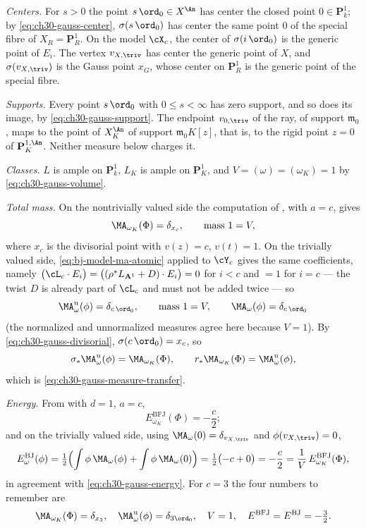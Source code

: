 \begin{example}
\emph{Centers.}  For $s>0$ the point $s\,\ord_0\in X^{\An}$ has center
the closed point $0\in\mathbf P^1_k$; by
\eqref{eq:ch30-gauss-center}, $\sigma(s\,\ord_0)$ has center the same
point $0$ of the special fibre of $X_R=\mathbf P^1_R$.  On the model
$\cX_c$, the center of $\sigma(i\,\ord_0)$ is the generic point of
$E_i$.  The vertex $v_{X,\triv}$ has center the generic point of $X$,
and $\sigma(v_{X,\triv})$ is the Gauss point $x_G$, whose center on
$\mathbf P^1_R$ is the generic point of the special fibre.

\emph{Supports.}  Every point $s\,\ord_0$ with $0\leq s<\infty$ has zero
support, and so does its image, by
\eqref{eq:ch30-gauss-support}.  The endpoint $v_{0,\triv}$ of the ray, of
support $\mathfrak m_0$, maps to the point of $X_K^{\An}$ of support
$\mathfrak m_0K[z]$, that is, to the rigid point $z=0$ of
$\mathbf P^{1,\An}_K$.  Neither measure below charges it.

\emph{Classes.}  $L$ is ample on $\mathbf P^1_k$, $L_K$ is ample on
$\mathbf P^1_K$, and $V=(\omega)=(\omega_K)=1$ by
\eqref{eq:ch30-gauss-volume}.

\emph{Total mass.}  On the nontrivially valued side the computation of
, with $a=c$, gives
\[
 \MA_{\omega_K}(\Phi)=\delta_{x_c},
 \qquad \text{mass }1=V,
\]
where $x_c$ is the divisorial point with $v(z)=c$, $v(t)=1$.  On the
trivially valued side, \eqref{eq:bj-model-ma-atomic} applied to
$\cY_c$ gives the same coefficients, namely
$\bigl(\cL_c\cdot E_i\bigr)
 =\bigl((\rho^*L_{\mathbf A^1}+D)\cdot E_i\bigr)=0$ for $i<c$ and
$=1$ for $i=c$ --- the twist $D$ is already part of $\cL_c$ and must
not be added twice --- so
\[
 \MA^{\mathrm u}_\omega(\phi)=\delta_{c\,\ord_0},
 \qquad\text{mass }1=V,
 \qquad
 \MA_\omega(\phi)=\delta_{c\,\ord_0}
\]
(the normalized and unnormalized measures agree here because $V=1$).  By
\eqref{eq:ch30-gauss-divisorial}, $\sigma(c\,\ord_0)=x_c$, so
\[
 \sigma_*\MA^{\mathrm u}_\omega(\phi)=\MA_{\omega_K}(\Phi),
 \qquad
 r_*\MA_{\omega_K}(\Phi)=\MA^{\mathrm u}_\omega(\phi),
\]
which is \eqref{eq:ch30-gauss-measure-transfer}.

\emph{Energy.}  From  with $d=1$, $a=c$,
\[
 E^{\mathrm{BFJ}}_{\omega_K}(\Phi)=-\frac c2 ;
\]
and on the trivially valued side, using
$\MA_\omega(0)=\delta_{v_{X,\triv}}$ and $\phi(v_{X,\triv})=0$,
\[
 E^{\mathrm{BJ}}_\omega(\phi)
 =\tfrac12\Bigl(\int\phi\,\MA_\omega(\phi)+\int\phi\,\MA_\omega(0)\Bigr)
 =\tfrac12\bigl(-c+0\bigr)=-\frac c2
 =\frac1V\,E^{\mathrm{BFJ}}_{\omega_K}(\Phi),
\]
in agreement with \eqref{eq:ch30-gauss-energy}.  For $c=3$ the four
numbers to remember are
\[
 \MA_{\omega_K}(\Phi)=\delta_{x_3},\quad
 \MA^{\mathrm u}_\omega(\phi)=\delta_{3\ord_0},\quad
 V=1,\quad
 E^{\mathrm{BFJ}}=E^{\mathrm{BJ}}=-\tfrac32 .
\]
\end{example}

